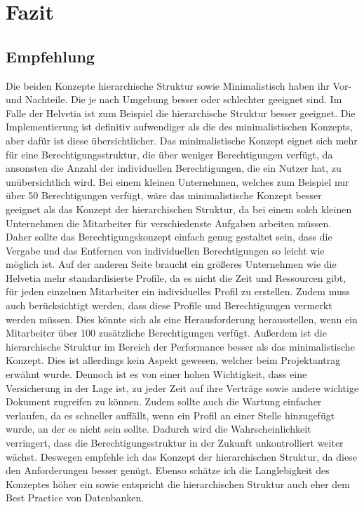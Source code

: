 \chapter{Fazit}
\label{ch:chapter06}

\section{Empfehlung}
\label{sec:chapter06}
Die beiden Konzepte hierarchische Struktur sowie Minimalistisch haben ihr Vor- und Nachteile.
Die je nach Umgebung besser oder schlechter geeignet sind.
Im Falle der Helvetia ist zum Beispiel die hierarchische Struktur besser geeignet.
\newline
Die Implementierung ist definitiv aufwendiger als die des minimalistischen Konzepts, aber dafür ist diese übersichtlicher.
Das minimalistische Konzept eignet sich mehr für eine Berechtigungsstruktur, die über weniger Berechtigungen verfügt, da ansonsten die Anzahl der individuellen Berechtigungen, die ein Nutzer hat, zu unübersichtlich wird.
Bei einem kleinen Unternehmen, welches zum Beispiel nur über 50 Berechtigungen verfügt, wäre das minimalistische Konzept besser geeignet als das Konzept der hierarchischen Struktur, da bei einem solch kleinen Unternehmen die Mitarbeiter für verschiedenste Aufgaben arbeiten müssen.
Daher sollte das Berechtigungskonzept einfach genug gestaltet sein, dass die Vergabe und das Entfernen von individuellen Berechtigungen so leicht wie möglich ist.
Auf der anderen Seite braucht ein größeres Unternehmen wie die Helvetia mehr standardisierte Profile, da es nicht die Zeit und Ressourcen gibt, für jeden einzelnen Mitarbeiter ein individuelles Profil zu erstellen.
Zudem muss auch berücksichtigt werden, dass diese Profile und Berechtigungen vermerkt werden müssen.
Dies könnte sich als eine Herausforderung herausstellen, wenn ein Mitarbeiter über 100 zusätzliche Berechtigungen verfügt.
\newline
Außerdem ist die hierarchische Struktur im Bereich der Performance besser als das minimalistische Konzept.
Dies ist allerdings kein Aspekt gewesen, welcher beim Projektantrag erwähnt wurde.
Dennoch ist es von einer hohen Wichtigkeit, dass eine Versicherung in der Lage ist, zu jeder Zeit auf ihre Verträge sowie andere wichtige Dokument zugreifen zu können.
\newline
Zudem sollte auch die Wartung einfacher verlaufen, da es schneller auffällt, wenn ein Profil an einer Stelle hinzugefügt wurde, an der es nicht sein sollte.
Dadurch wird die Wahrscheinlichkeit verringert, dass die Berechtigungsstruktur in der Zukunft unkontrolliert weiter wächst.
Deswegen empfehle ich das Konzept der hierarchischen Struktur, da diese den Anforderungen besser genügt.
Ebenso schätze ich die Langlebigkeit des Konzeptes höher ein sowie entspricht die hierarchischen Struktur auch eher dem Best Practice von Datenbanken.
\newpage

